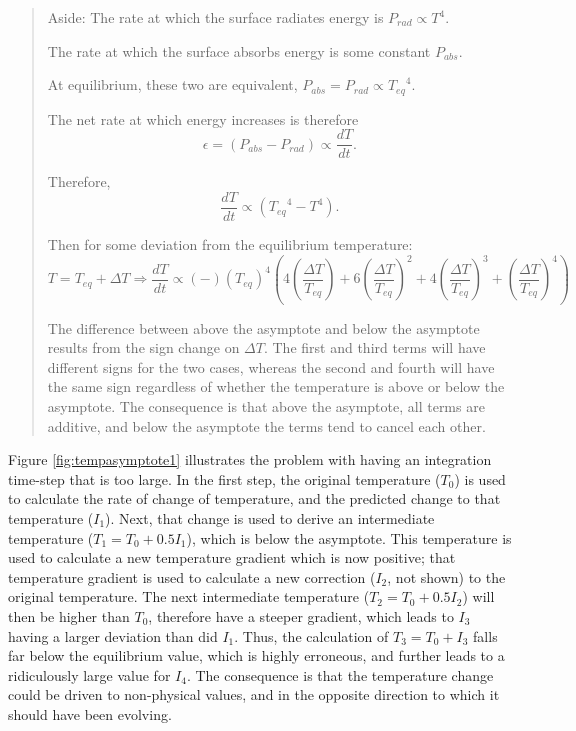\begin{quotation}
Aside:  The rate at which the surface radiates energy is $P_{rad} \propto T^4$.

The rate at which the surface absorbs energy is some constant $P_{abs}$.  

At equilibrium, these two are equivalent,  $P_{abs} = P_{rad} \propto {T_{eq}}^4$.


The net rate at which energy increases is therefore
\begin{equation*}
\epsilon = (P_{abs} - P_{rad}) \propto \frac{dT}{dt}.
\end{equation*}  

Therefore, 
\begin{equation*}
\frac{dT}{dt} \propto ({T_{eq}}^4 - T^4).
\end{equation*}  

Then for some deviation from the equilibrium temperature:
\begin{equation*}
T=T_{eq}+\Delta T \Rightarrow \frac{dT}{dt} \propto 
(-) \left( T_{eq} \right)^4 
\left(
4 \left( \frac{\Delta T}{T_{eq}} \right) + 
6 \left( \frac{\Delta T}{T_{eq}} \right)^2 + 
4 \left( \frac{\Delta T}{T_{eq}} \right)^3 + 
  \left( \frac{\Delta T}{T_{eq}} \right)^4 
\right)
\end{equation*}  

The difference between above the asymptote and below the asymptote results from the sign change on $\Delta T$.  The first and third terms will have different signs for the two cases, whereas the second and fourth will have the same sign regardless of whether the temperature is above or below the asymptote.  The consequence is that above the asymptote, all terms are additive, and below the asymptote the terms tend to cancel each other.

\end{quotation}

Figure \ref{fig:tempasymptote1} illustrates the problem with having an
integration time-step that is too large.  In the first step, the original
temperature ($T_0$) is used to calculate the rate of change of temperature, and
the predicted change to that temperature ($I_1$).  Next, that change is used to
derive an intermediate temperature ($T_1 = T_0 + 0.5 I_1$), which is below the
asymptote.  This temperature is used to calculate a new temperature gradient
which is now positive; that temperature gradient is used to calculate a new
correction ($I_2$, not shown) to the original temperature.  The next
intermediate temperature ($T_2 = T_0 + 0.5 I_2$) will then be higher than $T_0$,
therefore have a steeper gradient, which leads to $I_3$ having a larger
deviation than did $I_1$.  Thus, the calculation of $T_3 = T_0 + I_3$ falls far
below the equilibrium value, which is highly erroneous, and further leads to a
ridiculously large value for $I_4$.  The consequence is that the temperature
change could be driven to non-physical values, and in the opposite direction to which it should have been evolving.

